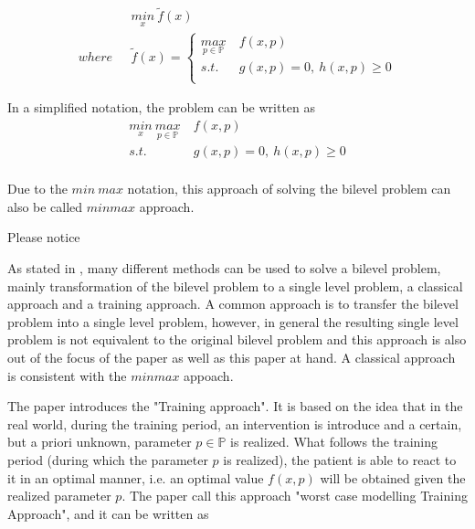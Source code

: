 \begin{equation}
	\begin{aligned}
		\  \  \ &  \underset{x}{min} \  \tilde f(x) \\
		where  \  \  \ & \tilde f(x) =    \begin{cases}
		  	\underset{p \in \mathbb{P}}{max} & \ f(x,p) \\
			s.t.   & \  g(x, p) = 0, \  h(x,p)  \geq  0 \\
		\end{cases}  	
	\end{aligned}
\end{equation}


In a simplified notation, the problem can be written as 
\begin{equation}
	\begin{aligned}
		\underset{x}{min} \   \underset{p \in \mathbb{P}}{max} & \  f(x,p) \\ 
		s.t.  & \  g(x, p) = 0, \  h(x,p)  \geq  0 \\
	\end{aligned}
\end{equation}


Due to the $min \ max$ notation, this approach of solving the bilevel problem can also be called $min max$ approach. 

Please notice 

As stated in \cite{MatSch22}, many different methods can be used to solve a bilevel problem, mainly transformation of the bilevel problem to a single level problem, a classical approach and a training approach. A common approach is to transfer the bilevel problem into a single level problem, however, in general the resulting single level problem is not equivalent to the original bilevel problem and this approach is also out of the focus of the paper \cite{MatSch22} as well as this paper at hand. A classical approach is consistent with the $minmax$ appoach. 

The paper \cite{MatSch22} introduces the "Training approach".  It is based on the idea that in the real world, during the training period, an intervention is introduce and a certain, but a priori unknown, parameter $p \in \mathbb{P}$ is realized. What follows the training period (during which the parameter $p$ is realized), the patient is able to react to it in an optimal manner, i.e. an optimal value $f(x,p)$ will be obtained given the  realized parameter $p$. The paper \cite{MatSch22} call this approach "worst case modelling Training Approach", and it can be written as 

